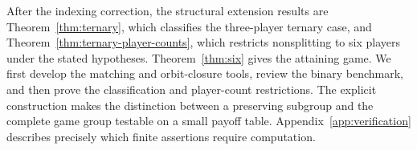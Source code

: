 After the indexing correction, the structural extension results are Theorem~\ref{thm:ternary}, which classifies the
three-player ternary case, and Theorem~\ref{thm:ternary-player-counts}, which
restricts nonsplitting to six players under the stated hypotheses.
Theorem~\ref{thm:six} gives the attaining game. We first develop the matching
and orbit-closure tools, review the binary benchmark, and then prove the
classification and player-count restrictions. The explicit construction
makes the distinction between a preserving subgroup and the complete game
group testable on a small payoff table. Appendix~\ref{app:verification}
describes precisely which finite assertions require computation.
